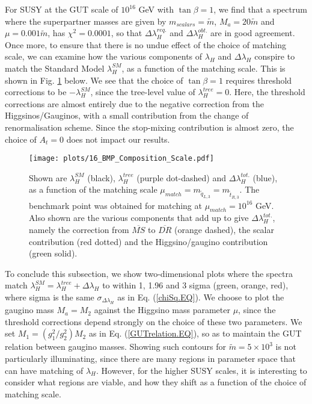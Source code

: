 \documentclass[12pt]{article}
\newcommand{\sq}{\tilde{q}}
\newcommand{\mStL}{m_{\sq_{L,3}}}
\newcommand{\mStR}{m_{\tilde{t}_{R,3}}}
\newcommand{\MS}{\overline{MS}}
\newcommand{\DR}{\overline{DR}}
\newcommand{\mS}{\tilde{m}}
\begin{document}
For SUSY at the GUT scale of $10^{16}$ GeV with $\tan\beta=1$, we find that a spectrum where the superpartner masses are given by $m_{scalars}=\mS$, $M_a =20\mS$ and $\mu = 0.001 \mS$, has $\chi^2=0.0001$, so that $\Delta\lambda_H^{req.}$ and $\Delta\lambda_H^{obt.}$ are in good agreement. Once more, to ensure that there is no undue effect of the choice of matching scale, we can examine how the various components of $\lambda_H$ and $\Delta\lambda_H$ conspire to match the Standard Model $\lambda_H^{SM}$, as a function of the matching scale. This is shown in Fig. \ref{16_matching.FIG} below. We see that the choice of $\tan\beta=1$ requires threshold corrections to be $-\lambda^{SM}_H$, since the tree-level value of $\lambda_H^{tree}=0$. Here, the threshold corrections are almost entirely due to the negative correction from the Higgsinos/Gauginos, with a small contribution from the change of renormalisation scheme. Since the stop-mixing contribution is almost zero, the choice of $A_t=0$ does not impact our results.

\begin{figure}[t]
\centering
\texttt{[image: plots/16\_BMP\_Composition\_Scale.pdf]}
\caption{Shown are $\lambda_H^{SM}$ (black), $\lambda_H^{tree}$ (purple dot-dashed) and $\Delta\lambda_H^{tot.}$ (blue), as a function of the matching scale $\mu_{match} = \mStL =\mStR$. The benchmark point was obtained for matching at $\mu_{match}=10^{16}$ GeV. Also shown are the various components that add up to give $\Delta\lambda_H^{tot.}$, namely the correction from $\MS$ to $\DR$ (orange dashed), the scalar contribution (red dotted) and the Higgsino/gaugino contribution (green solid).}
\label{16_matching.FIG}
\end{figure}


To conclude this subsection, we show two-dimensional plots where the spectra match $\lambda^{SM}_H = \lambda^{tree}_H + \Delta\lambda_H$ to within 1, 1.96 and 3 sigma (green, orange, red), where sigma is the same $\sigma_{\Delta\lambda_H}$ as in Eq. (\ref{chiSq.EQ}). We choose to plot the gaugino mass $M_a=M_2$ against the Higgsino mass parameter $\mu$, since the threshold corrections depend strongly on the choice of these two parameters. We set $M_1 = (g_1^2/g_2^2) M_2$ as in Eq. (\ref{GUTrelation.EQ}), so as to maintain the GUT relation between gaugino masses. Showing such contours for $\mS=5\times10^3$ is not particularly illuminating, since there are many regions in parameter space that can have matching of $\lambda_H$. However, for the higher SUSY scales, it is interesting to consider what regions are viable, and how they shift as a function of the choice of matching scale.
\end{document}
